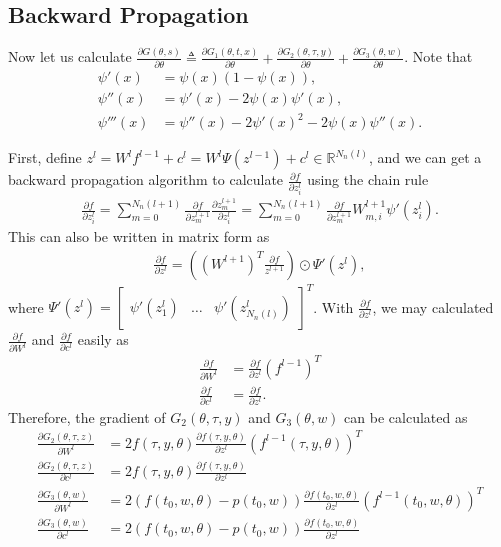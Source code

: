 \documentclass[10pt]{article}
\newcommand{\real}{\ensuremath{\mathbb{R}}}
\begin{document}
\subsection{Backward Propagation}
Now let us calculate $\frac{\partial G(\theta,s)}{\partial \theta} \triangleq \frac{\partial G_1(\theta,t,x)}{\partial \theta} + \frac{\partial G_2(\theta,\tau,y)}{\partial \theta} + \frac{\partial G_3(\theta,w)}{\partial \theta}$.
Note that
\begin{align}
	\psi'(x) &= \psi(x)(1-\psi(x)), \\
	\psi''(x) &= \psi'(x) - 2\psi(x)\psi'(x), \\
	\psi'''(x) &= \psi''(x) - 2\psi'(x)^2 - 2\psi(x)\psi''(x).
\end{align}

First, define $z^l = W^lf^{l-1}+c^l = W^l\Psi(z^{l-1}) + c^l \in \real^{N_n(l)}$, and we can get a backward propagation algorithm to calculate $\frac{\partial f}{\partial z^l_i}$ using the chain rule
\begin{align}
	\frac{\partial f}{\partial z^l_i} = \sum_{m = 0}^{N_n(l+1)} \frac{\partial f}{\partial z_m^{l+1}} \frac{\partial z_m^{l+1}}{\partial z_i^l} = \sum_{m = 0}^{N_n(l+1)} \frac{\partial f}{\partial z_m^{l+1}} W^{l+1}_{m,i} \psi'(z^l_i).
\end{align}
This can also be written in matrix form as
\begin{align}
	\frac{\partial f}{\partial z^l} = \left( (W^{l+1})^T \frac{\partial f}{z^{l+1}} \right) \odot \Psi'(z^l),
\end{align}
where $\Psi'(z^l) = \begin{bmatrix} \psi'(z^l_1) & \ldots & \psi'(z^l_{N_n(l)}) \end{bmatrix}^T$.
With $\frac{\partial f}{\partial z^l}$, we may calculated $\frac{\partial f}{\partial W^l}$ and $\frac{\partial f}{\partial c^l}$ easily as
\begin{align}
	\frac{\partial f}{\partial W^l} &= \frac{\partial f}{\partial z^l} (f^{l-1})^T \\
	\frac{\partial f}{\partial c^l} &= \frac{\partial f}{\partial z^l}.
\end{align}
Therefore, the gradient of $G_2(\theta,\tau,y)$ and $G_3(\theta,w)$ can be calculated as
\begin{align}
	\frac{\partial G_2(\theta,\tau,z)}{\partial W^l} &= 2f(\tau,y,\theta) \frac{\partial f(\tau,y,\theta)}{\partial z^l} (f^{l-1}(\tau,y,\theta))^T \\
	\frac{\partial G_2(\theta,\tau,z)}{\partial c^l} &= 2f(\tau,y,\theta) \frac{\partial f(\tau,y,\theta)}{\partial z^l} \\
	\frac{\partial G_3(\theta,w)}{\partial W^l} &= 2(f(t_0,w,\theta) - p(t_0,w)) \frac{\partial f(t_0,w,\theta)}{\partial z^l} (f^{l-1}(t_0,w,\theta))^T \\
	\frac{\partial G_3(\theta,w)}{\partial c^l} &= 2(f(t_0,w,\theta) - p(t_0,w)) \frac{\partial f(t_0,w,\theta)}{\partial z^l}
\end{align}
\end{document}
